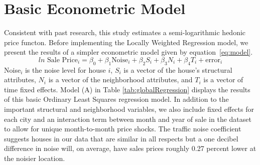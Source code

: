 \documentclass{article}\usepackage{graphicx, color}
\begin{document}
\section{Basic Econometric Model}\label{basicModel}
Consistent with past research, this study estimates a semi-logarithmic hedonic price functon.  Before implementing the Locally Weighted Regression model, we present the results of a simpler econometric model given by equation~\eqref{eq:model}.
\begin{equation}\label{eq:model}	
ln \textrm{ Sale Price}_i = \beta _0 + \beta _1 \textrm{Noise}_i+ \beta _2 S_i+ \beta _3 N_i + \beta _4 T_i + \textrm{error}_i
\end{equation}
Noise$_i$ is the noise level for house $i$, $S_i$ is a vector of the house's structural attributes, $N_i$ is a vector of the neighborhood attributes, and $T_i$ is a vector of time fixed effects. Model (A) in Table \ref{tab:globalRegression} displays the results of this basic Ordinary Least Squares regression model. In addition to the important structural and neighborhood variables, we also include fixed effects for each city and an interaction term between month and year of sale in the dataset to allow for unique month-to-month price shocks. The traffic noise coefficient suggests houses in our data that are similar in all respects but a one decibel difference in noise will, on average, have sales prices roughly 0.27 percent lower at the noisier location. 
\end{document}
